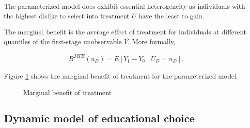 \begin{boenumerate}
The parameterized model does exhibit essential heterogeneity as individuals with the highest dislike to select into treatment $U$ have the least to gain.


\item The marginal benefit is the average effect of treatment for individuals at different quantiles of the first-stage unobservable $V$. More formally,

\begin{align*}
    B^{MTE}(u_D) = E [Y_1 - Y_0 \mid U_D = u_D].
\end{align*}

Figure \ref{Marginal benefit of treatment} shows the marginal benefit of treatment for the parameterized model.

\begin{figure}[htp]\centering
\caption{Marginal benefit of treatment}\label{Marginal benefit of treatment}
\end{figure}

\end{boenumerate}
\FloatBarrier\subsection{Dynamic model of educational choice}
